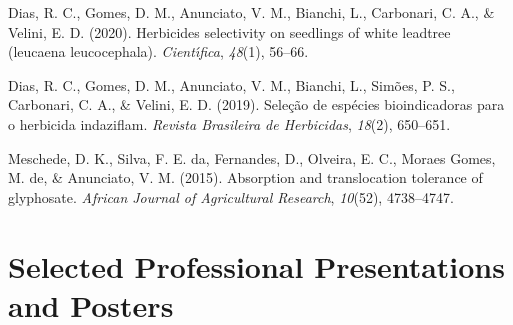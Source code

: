 \documentclass[11pt, a4paper]{awesome-cv}
\begin{document}
\leavevmode\hypertarget{ref-dias2020herbicides}{}%
Dias, R. C., Gomes, D. M., Anunciato, V. M., Bianchi, L., Carbonari, C.
A., \& Velini, E. D. (2020). Herbicides selectivity on seedlings of
white leadtree (leucaena leucocephala). \emph{Cient{ı́}fica},
\emph{48}(1), 56--66.

\leavevmode\hypertarget{ref-dias2019seleccao}{}%
Dias, R. C., Gomes, D. M., Anunciato, V. M., Bianchi, L., Simões, P. S.,
Carbonari, C. A., \& Velini, E. D. (2019). Sele{ç}{ã}o de esp{é}cies
bioindicadoras para o herbicida indaziflam. \emph{Revista Brasileira de
Herbicidas}, \emph{18}(2), 650--651.

\leavevmode\hypertarget{ref-meschede2015absorption}{}%
Meschede, D. K., Silva, F. E. da, Fernandes, D., Olveira, E. C., Moraes
Gomes, M. de, \& Anunciato, V. M. (2015). Absorption and translocation
tolerance of glyphosate. \emph{African Journal of Agricultural
Research}, \emph{10}(52), 4738--4747.

\hypertarget{selected-professional-presentations-and-posters}{%
\section{Selected Professional Presentations and
Posters}\label{selected-professional-presentations-and-posters}}
\end{document}
